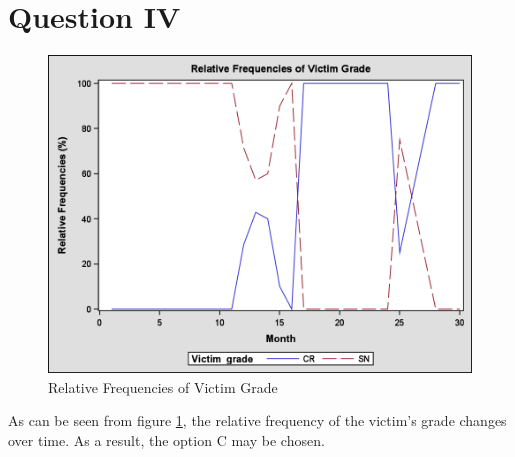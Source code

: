 \section*{Question IV}

\begin{figure}[H]
\centering
\includegraphics[scale=0.25]{Pic/Q4/1.png}
\caption{Relative Frequencies of Victim Grade}
\label{f10}
\end{figure}

As can be seen from figure \ref{f10}, the relative frequency of the victim's grade changes over time. As a result, the option C may be chosen.